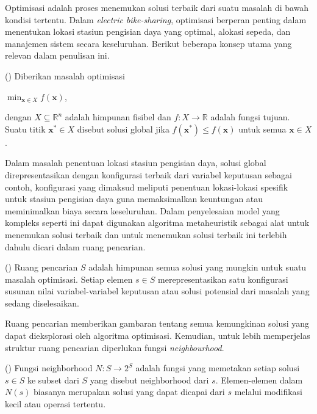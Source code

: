 Optimisasi adalah proses menemukan solusi terbaik dari suatu masalah di bawah kondisi tertentu. Dalam \textit{electric bike-sharing}, optimisasi berperan penting dalam menentukan lokasi stasiun pengisian daya yang optimal, alokasi sepeda, dan manajemen sistem secara keseluruhan. Berikut beberapa konsep utama yang relevan dalam penulisan ini.
\begin{definisi}()
Diberikan masalah optimisasi
\begin{center}
    $\min_{\boldsymbol{x} \in X} f(\boldsymbol{x})$,
\end{center}
    dengan $X \subseteq \mathbb{R}^n$ adalah himpunan fisibel dan $f: X \rightarrow \mathbb{R}$ adalah fungsi tujuan. Suatu titik $\boldsymbol{x^*} \in X$ disebut solusi global jika $f(\boldsymbol{x^*}) \leq f(\boldsymbol{x})$ untuk semua $\boldsymbol{x} \in X$.
\end{definisi}
Dalam masalah penentuan lokasi stasiun pengisian daya, solusi global direpresentasikan dengan konfigurasi terbaik dari variabel keputusan sebagai contoh, konfigurasi yang dimaksud meliputi penentuan lokasi-lokasi spesifik untuk stasiun pengisian daya guna memaksimalkan keuntungan atau meminimalkan biaya secara keseluruhan.  Dalam penyelesaian model yang kompleks seperti ini dapat digunakan algoritma metaheuristik sebagai alat untuk menemukan solusi terbaik dan untuk menemukan solusi terbaik ini terlebih dahulu dicari dalam ruang pencarian.

\begin{definisi} ()
    Ruang pencarian $S$ adalah himpunan semua solusi yang mungkin untuk suatu masalah optimisasi. Setiap elemen $s \in S$ merepresentasikan satu konfigurasi susunan nilai variabel-variabel keputusan atau solusi potensial dari masalah yang sedang diselesaikan.
\end{definisi}

Ruang pencarian memberikan gambaran tentang semua kemungkinan solusi yang dapat dieksplorasi oleh algoritma optimisasi. Kemudian, untuk lebih memperjelas struktur ruang pencarian diperlukan fungsi \textit{neighbourhood}.

\begin{definisi} ()
    Fungsi neighborhood $N: S \rightarrow 2^S$ adalah fungsi yang memetakan setiap solusi $s \in S$ ke subset dari $S$ yang disebut neighborhood dari $s$. Elemen-elemen dalam $N(s)$ biasanya merupakan solusi yang dapat dicapai dari $s$ melalui modifikasi kecil atau operasi tertentu.
\end{definisi}

